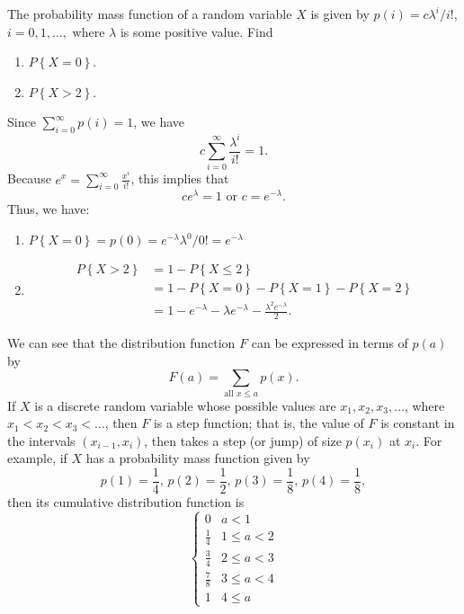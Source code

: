 \begin{changebar}
    \begin{example}
        The probability mass function of a random variable $X$ is given by $p(i) = c\lambda^i/i!$, $i = 0, 1, \dots,$ where $\lambda$ is some positive value. Find \begin{enumerate}[label=(\alph*)]
            \item $P\left\{ X = 0 \right\}$.
            \item $P\left\{ X > 2 \right\}$.
        \end{enumerate}
    \end{example}
    \begin{solution}
        Since $\displaystyle \sum^\infty_{i = 0} p(i) = 1$, we have \[
            c \sum^\infty_{i = 0} \frac{\lambda^i}{i!} = 1.    
        \] Because $\displaystyle e^x = \sum^\infty_{i = 0} \frac{x^i}{i!}$, this implies that \[
            ce^\lambda = 1 \text{ or } c = e^{-\lambda}.    
        \]
        Thus, we have: \begin{enumerate}[label=(\alph*)]
            \item $P\left\{ X = 0 \right\} = p(0) = e^{-\lambda}\lambda^0/0! = e^{-\lambda}$
            \item \[
                \begin{aligned}
                    P\left\{ X > 2 \right\} &= 1 - P\left\{ X \leq 2 \right\} \\
                    &= 1 - P\left\{ X = 0 \right\} - P\left\{ X = 1 \right\} - P\left\{ X = 2 \right\} \\
                    &= 1 - e^{-\lambda} - \lambda e^{-\lambda} - \frac{\lambda^2e^{-\lambda}}{2}.
                \end{aligned}    
            \]
        \end{enumerate}
    \end{solution}
\end{changebar}

We can see that the distribution function $F$ can be expressed in terms of $p(a)$ by \[
    F(a) = \sum_{\text{all $x \leq a$}} p(x).    
\] If $X$ is a discrete random variable whose possible values are $x_1, x_2, x_3, \dots$, where $x_1 < x_2 < x_3 < \dots$, then $F$ is a step function; that is, the value of $F$ is constant in the intervals $(x_{i-1}, x_i)$, then takes a step (or jump) of size $p(x_i)$ at $x_i$. For example, if $X$ has a probability mass function given by \[
    p(1) = \frac{1}{4},\, p(2) = \frac{1}{2},\, p(3) = \frac{1}{8},\, p(4) = \frac{1}{8},
\] then its cumulative distribution function is \[
    \begin{cases}
        0 & a < 1 \\
        \frac{1}{4} & 1 \leq a < 2 \\
        \frac{3}{4} & 2 \leq a < 3 \\
        \frac{7}{8} & 3 \leq a < 4 \\
        1 & 4 \leq a
    \end{cases}
\]
\pagebreak
